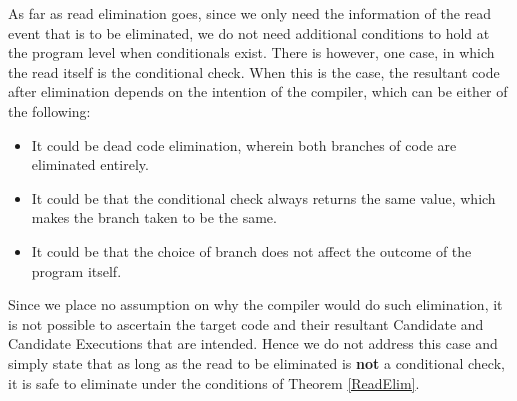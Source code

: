     As far as read elimination goes, since we only need the information of the read event that is to be eliminated, we do not need additional conditions to hold at the program level when conditionals exist. 
    There is however, one case, in which the read itself is the conditional check. 
    When this is the case, the resultant code after elimination depends on the intention of the compiler, which can be either of the following:
    \begin{itemize}
        \item It could be dead code elimination, wherein both branches of code are eliminated entirely. 
        \item It could be that the conditional check always returns the same value, which makes the branch taken to be the same. 
        \item It could be that the choice of branch does not affect the outcome of the program itself. 
    \end{itemize}
    
    Since we place no assumption on why the compiler would do such elimination, it is not possible to ascertain the target code and their resultant Candidate and Candidate Executions that are intended. 
    Hence we do not address this case and simply state that as long as the read to be eliminated is \textbf{not} a conditional check, it is safe to eliminate under the conditions of Theorem \ref{ReadElim}. 
    